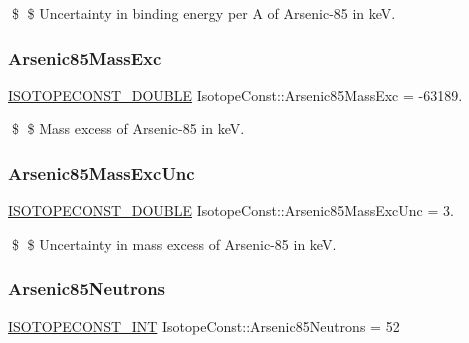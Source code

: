 \$ \$ Uncertainty in binding energy per A of Arsenic-\/85 in keV. \mbox{\label{group___isotope_const-_arsenic-_as85_gae268e3bc227dbf53f69a84d17dd1ee1d}} 
\subsubsection{\texorpdfstring{Arsenic85\+Mass\+Exc}{Arsenic85MassExc}}
{\footnotesize\ttfamily \mbox{\hyperlink{group___isotope_const-_macros_ga8f45a7272ce02c0b4c65c44636ed719a}{I\+S\+O\+T\+O\+P\+E\+C\+O\+N\+S\+T\+\_\+\+D\+O\+U\+B\+LE}} Isotope\+Const\+::\+Arsenic85\+Mass\+Exc = -\/63189.}

\$ \$ Mass excess of Arsenic-\/85 in keV. \mbox{\label{group___isotope_const-_arsenic-_as85_ga624ae886a2f8f5b98096cbac9d4886dc}} 
\subsubsection{\texorpdfstring{Arsenic85\+Mass\+Exc\+Unc}{Arsenic85MassExcUnc}}
{\footnotesize\ttfamily \mbox{\hyperlink{group___isotope_const-_macros_ga8f45a7272ce02c0b4c65c44636ed719a}{I\+S\+O\+T\+O\+P\+E\+C\+O\+N\+S\+T\+\_\+\+D\+O\+U\+B\+LE}} Isotope\+Const\+::\+Arsenic85\+Mass\+Exc\+Unc = 3.}

\$ \$ Uncertainty in mass excess of Arsenic-\/85 in keV. \mbox{\label{group___isotope_const-_arsenic-_as85_gabf99f319752a6f71d2244fd2bcc91172}} 
\subsubsection{\texorpdfstring{Arsenic85\+Neutrons}{Arsenic85Neutrons}}
{\footnotesize\ttfamily \mbox{\hyperlink{group___isotope_const-_macros_ga5f18360b3e99483a35c32d789e62621c}{I\+S\+O\+T\+O\+P\+E\+C\+O\+N\+S\+T\+\_\+\+I\+NT}} Isotope\+Const\+::\+Arsenic85\+Neutrons = 52}

